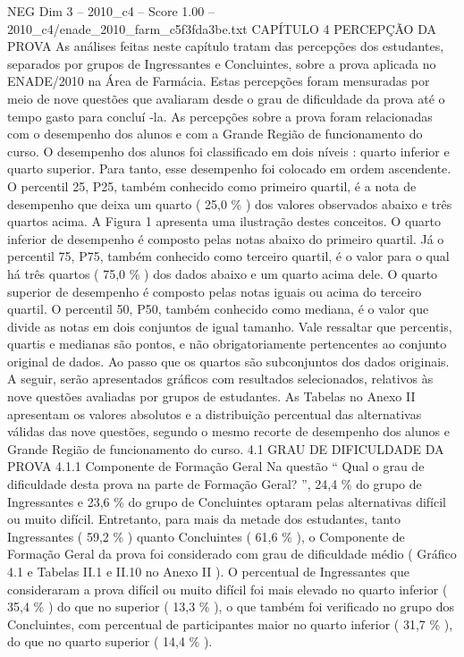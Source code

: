 \begin{textsample}{NEG Dim 3 – 2010\_c4 – Score 1.00 – 2010\_c4/enade\_2010\_farm\_c5f3fda3be.txt}  \label{ex:f3_neg_119}
CAPÍTULO 4 PERCEPÇÃO DA PROVA As análises feitas neste capítulo tratam das percepções dos estudantes, separados por grupos de Ingressantes e Concluintes, sobre a prova aplicada no ENADE/2010 na Área de Farmácia.
Estas percepções foram mensuradas por meio de nove questões que avaliaram desde o grau de dificuldade da prova até o tempo gasto para concluí -la.
As percepções sobre a prova foram relacionadas com o desempenho dos alunos e com a Grande Região de funcionamento do curso.
O desempenho dos alunos foi classificado em dois níveis : quarto inferior e quarto superior.
Para tanto, esse desempenho foi colocado em ordem ascendente.
O percentil 25, P25, também conhecido como primeiro quartil, é a nota de desempenho que deixa um quarto ( 25,0 \% ) dos valores observados abaixo e três quartos acima.
A Figura 1 apresenta uma ilustração destes conceitos.
O quarto inferior de desempenho é composto pelas notas abaixo do primeiro quartil.
Já o percentil 75, P75, também conhecido como terceiro quartil, é o valor para o qual há três quartos ( 75,0 \% ) dos dados abaixo e um quarto acima dele.
O quarto superior de desempenho é composto pelas notas iguais ou acima do terceiro quartil.
O percentil 50, P50, também conhecido como mediana, é o valor que divide as notas em dois conjuntos de igual tamanho.
Vale ressaltar que percentis, quartis e medianas são pontos, e não obrigatoriamente pertencentes ao conjunto original de dados.
Ao passo que os quartos são subconjuntos dos dados originais.
A seguir, serão apresentados gráficos com resultados selecionados, relativos às nove questões avaliadas por grupos de estudantes.
As Tabelas no Anexo II apresentam os valores absolutos e a distribuição percentual das alternativas válidas das nove questões, segundo o mesmo recorte de desempenho dos alunos e Grande Região de funcionamento do curso. 4.1 GRAU DE DIFICULDADE DA PROVA 4.1.1 Componente de Formação Geral Na questão “ Qual o grau de dificuldade desta prova na parte de Formação Geral? ”, 24,4 \% do grupo de Ingressantes e 23,6 \% do grupo de Concluintes optaram pelas alternativas difícil ou muito difícil.
Entretanto, para mais da metade dos estudantes, tanto Ingressantes ( 59,2 \% ) quanto Concluintes ( 61,6 \% ), o Componente de Formação Geral da prova foi considerado com grau de dificuldade médio ( Gráfico 4.1 e Tabelas II.1 e II.10 no Anexo II ).
O percentual de Ingressantes que consideraram a prova difícil ou muito difícil foi mais elevado no quarto inferior ( 35,4 \% ) do que no superior ( 13,3 \% ), o que também foi verificado no grupo dos Concluintes, com percentual de participantes maior no quarto inferior ( 31,7 \% ), do que no quarto superior ( 14,4 \% ).

\end{textsample}
